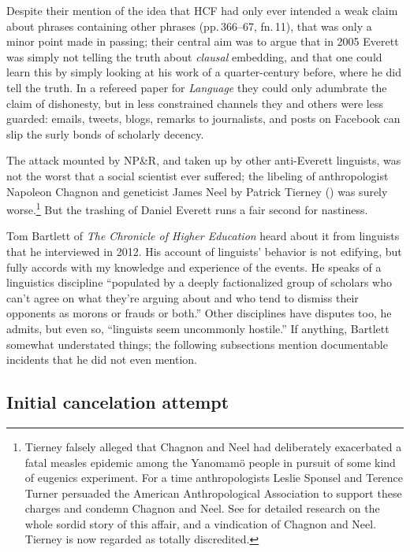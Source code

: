 \documentclass[output=paper,colorlinks,citecolor=brown
]{langscibook}
\begin{document}
Despite their mention of the idea that HCF had only ever intended a
weak claim about phrases containing other phrases (pp.\,366--67,
fn.\,11), that was only a minor point made in passing; their central
aim was to argue that in 2005 Everett was simply not telling the truth
about \emph{clausal} embedding, and that one could learn this by
simply looking at his work of a quarter-century before, where he did
tell the truth. In a refereed paper for \textit{Language} they could
only adumbrate the claim of dishonesty, but in less constrained
channels they and others were less guarded: emails, tweets, blogs,
remarks to journalists, and posts on Facebook can slip the surly bonds
of scholarly decency.

The attack mounted by NP\&R, and taken up by other anti-Everett
linguists, was not the worst that a social scientist ever suffered;
the libeling of anthropologist Napoleon Chagnon and geneticist James
Neel by Patrick Tierney (\citeyear{Tierney00}) was surely worse.\footnote{%
   Tierney falsely alleged that Chagnon and Neel had deliberately
   exacerbated a fatal measles epidemic among the Yanomam{\"o} people
   in pursuit of some kind of eugenics experiment. For a time
   anthropologists Leslie Sponsel and Terence Turner persuaded the
   American Anthropological Association to support these charges and
   condemn Chagnon and Neel. See \citet{Dreger11} for detailed
   research on the whole sordid story of this affair, and a vindication
   of Chagnon and Neel. Tierney is now regarded as totally discredited.}
But the trashing of Daniel Everett runs a fair second for nastiness.

Tom Bartlett of \textit{The Chronicle of Higher Education} heard
about it from linguists that he interviewed in 2012. His account of
linguists' behavior \citep{Bartlett12} is not edifying, but fully
accords with my knowledge and experience of the events. He speaks
of a linguistics discipline ``populated by a deeply factionalized
group of scholars who can't agree on what they're arguing about
and who tend to dismiss their opponents as morons or frauds or both.''
Other disciplines have disputes too, he admits, but even so,
``linguists seem uncommonly hostile.'' If anything, Bartlett somewhat
understated things; the following subsections mention documentable
incidents that he did not even mention.

\subsection{Initial cancelation attempt}\label{river}
\end{document}
